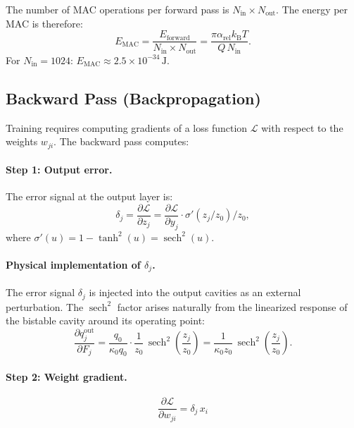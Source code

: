 \documentclass[11pt,twocolumn]{article}
\theoremstyle{definition}
\theoremstyle{remark}
\newcommand{\kB}{k_{\mathrm{B}}}
\DeclareMathOperator{\sech}{sech}
\begin{document}
The number of MAC operations per forward pass is $N_{\mathrm{in}}
\times N_{\mathrm{out}}$. The energy per MAC is therefore:
\begin{equation}
E_{\mathrm{MAC}} = \frac{E_{\mathrm{forward}}}{N_{\mathrm{in}} \times N_{\mathrm{out}}}
= \frac{\pi\alpha_{\mathrm{rel}}\kB T}{Q\,N_{\mathrm{in}}}.
\end{equation}
For $N_{\mathrm{in}} = 1024$: $E_{\mathrm{MAC}} \approx 2.5\times
10^{-34}\,\mathrm{J}$.

\subsection{Backward Pass (Backpropagation)}\label{sec:backward}

Training requires computing gradients of a loss function $\mathcal{L}$
with respect to the weights $w_{ji}$. The backward pass computes:

\paragraph{Step 1: Output error.}
The error signal at the output layer is:
\begin{equation}
\delta_j = \frac{\partial\mathcal{L}}{\partial z_j}
= \frac{\partial\mathcal{L}}{\partial y_j}\cdot\sigma'(z_j/z_0)/z_0,
\label{eq:output_error}
\end{equation}
where $\sigma'(u) = 1 - \tanh^2(u) = \sech^2(u)$.

\paragraph{Physical implementation of $\delta_j$.}
The error signal $\delta_j$ is injected into the output cavities as an
external perturbation. The $\sech^2$ factor arises naturally from the
linearized response of the bistable cavity around its operating point:
\begin{equation}
\frac{\partial q_j^{\mathrm{out}}}{\partial F_j}
= \frac{q_0}{\kappa_0 q_0}\cdot\frac{1}{z_0}\,\sech^2\!\left(\frac{z_j}{z_0}\right)
= \frac{1}{\kappa_0 z_0}\,\sech^2\!\left(\frac{z_j}{z_0}\right).
\end{equation}

\paragraph{Step 2: Weight gradient.}
\begin{equation}
\boxed{
\frac{\partial\mathcal{L}}{\partial w_{ji}} = \delta_j\,x_i
}
\label{eq:weight_gradient}
\end{equation}
\end{document}

